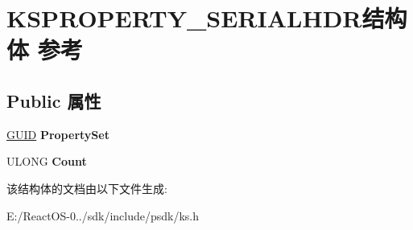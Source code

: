 \hypertarget{struct_k_s_p_r_o_p_e_r_t_y___s_e_r_i_a_l_h_d_r}{}\section{K\+S\+P\+R\+O\+P\+E\+R\+T\+Y\+\_\+\+S\+E\+R\+I\+A\+L\+H\+D\+R结构体 参考}
\label{struct_k_s_p_r_o_p_e_r_t_y___s_e_r_i_a_l_h_d_r}
\subsection*{Public 属性}
\begin{DoxyCompactItemize}
\item 
\mbox{\label{struct_k_s_p_r_o_p_e_r_t_y___s_e_r_i_a_l_h_d_r_a3381c08110f488b315426206ad638523}} 
\hyperlink{interface_g_u_i_d}{G\+U\+ID} {\bfseries Property\+Set}
\item 
\mbox{\label{struct_k_s_p_r_o_p_e_r_t_y___s_e_r_i_a_l_h_d_r_af9b04e70162c00ec83064e3d9f15bb9c}} 
U\+L\+O\+NG {\bfseries Count}
\end{DoxyCompactItemize}


该结构体的文档由以下文件生成\+:\begin{DoxyCompactItemize}
\item 
E\+:/\+React\+O\+S-\/0../sdk/include/psdk/ks.\+h\end{DoxyCompactItemize}
